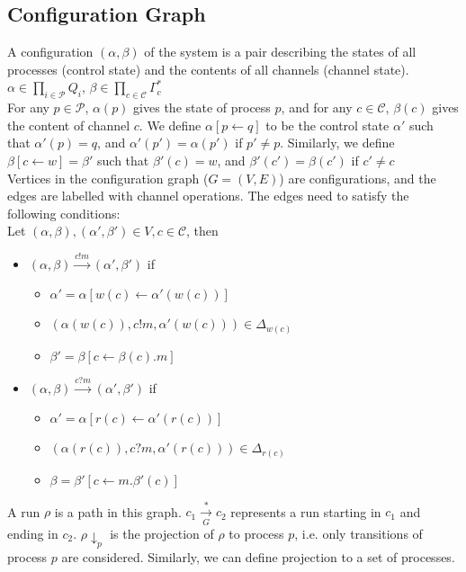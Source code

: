 \documentclass[a4paper,UKenglish,cleveref, autoref, thm-restate]{lipics-v2019}
\begin{document}
\subsection{Configuration Graph}


\hspace*{0.5cm}A configuration $(\alpha, \beta)$ of the system is a pair describing the states of all processes (control state) and the contents of all channels (channel state). \\
\hspace*{5cm} ${\displaystyle \alpha \in \prod_{i \in \mathcal{P}} Q_i}$, ${\displaystyle \beta \in \prod_{c \in \mathcal{C}} \Gamma_c^*}$\\
\hspace*{0.5cm}For any $p \in \mathcal{P}$, $\alpha(p)$ gives the state of process $p$, and for any $c \in \mathcal{C}$, $\beta(c)$ gives the content of channel $c$. We define $\alpha[p \leftarrow q]$ to be the control state  $\alpha'$ such that $\alpha'(p) = q$, and $\alpha'(p') = \alpha(p')$ if $p' \neq p$. Similarly, we define $\beta[c \leftarrow w]= \beta'$ such that $\beta'(c) = w$, and $\beta'(c') = \beta(c')$ if $c' \neq c$\\
\hspace*{0.5cm}Vertices in the configuration graph ($G = (V, E)$) are configurations, and the edges are labelled with channel operations. The edges need to satisfy the following conditions: \\
Let $(\alpha, \beta), (\alpha', \beta') \in V, c \in \mathcal{C}$, then 
\begin{itemize}
\item $(\alpha, \beta) \xrightarrow{c!m} (\alpha', \beta')$ if
\begin{itemize}
    \item $\alpha' = \alpha[w(c) \leftarrow \alpha'(w(c))]$
    \item $(\alpha(w(c)), c!m, \alpha'(w(c))) \in \Delta_{w(c)}$
    \item $\beta' = \beta[c \leftarrow \beta(c).m]$

\end{itemize}


\item $(\alpha, \beta) \xrightarrow{c?m} (\alpha', \beta')$ if
\begin{itemize}
    \item $\alpha' = \alpha[r(c) \leftarrow \alpha'(r(c))]$
    \item $(\alpha(r(c)), c?m, \alpha'(r(c))) \in \Delta_{r(c)}$
    \item $\beta = \beta'[c \leftarrow m.\beta'(c)]$

\end{itemize}
\end{itemize}
\hspace*{0.5cm}A run $\rho$ is a path in this graph. $c_1 \xrightarrow[G]{*} c_2 $ represents a run starting in $c_1$ and ending in $c_2$. $\rho \downarrow_{p}$ is the projection of $\rho$ to process $p$, i.e. only transitions of process $p$ are considered. Similarly, we can define projection to a set of processes.
\end{document}
